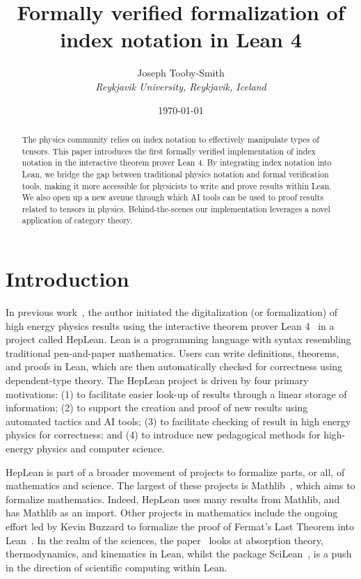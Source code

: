 \documentclass[a4paper, 11pt]{article}
\title{Formally verified formalization of index notation in Lean 4}
\author{Joseph Tooby-Smith \\ \textit{Reykjavik University, Reykjavik, Iceland}}
\date{\today}
\begin{document}
\maketitle
\vspace{-1cm}
\begin{abstract}
The physics community relies on index notation to effectively manipulate types of tensors.
This paper introduces the first formally verified implementation of index notation in the
interactive theorem prover Lean 4. By integrating index notation into Lean, we bridge the gap between 
traditional physics notation and formal verification tools, 
making it more accessible for physicists to write and prove results within Lean.
We also open up a new avenue through which AI tools can be used to proof results
related to tensors in physics.
Behind-the-scenes our implementation leverages a novel application of category theory.
\end{abstract}

\section{Introduction}

In previous work~\cite{HepLean}, the author initiated the digitalization (or formalization) 
of high energy physics 
results using the interactive theorem prover Lean 4~\cite{lean} in a project called HepLean. 
Lean is a
programming language with syntax resembling traditional pen-and-paper mathematics. 
Users can write definitions, theorems, and proofs in Lean,
which are then automatically checked for correctness using dependent-type theory.
The HepLean project is driven by four primary motivations: (1) to facilitate easier look-up of results
 through a linear storage of information; (2) to support the creation and proof of new results using 
 automated tactics and AI tools; (3) to facilitate checking of result in high energy physics for correctness; 
 and (4) to introduce new pedagogical methods for high-energy physics and computer science.

HepLean is part of a broader movement of projects
to formalize parts, or all, of 
mathematics and science. The largest of these projects is Mathlib~\cite{mathlib}, which aims to formalize
mathematics. Indeed, HepLean uses many results from Mathlib, and has Mathlib as an import.
Other projects in mathematics include the ongoing effort led by Kevin Buzzard to formalize the proof of Fermat's
Last Theorem into Lean~\cite{FLT}. 
In the realm of the sciences, the paper~\cite{josephson} looks at absorption theory, thermodynamics, and kinematics in Lean, 
whilst the package SciLean~\cite{SciLean}, is a push in the direction of scientific computing within Lean. 
\end{document}
